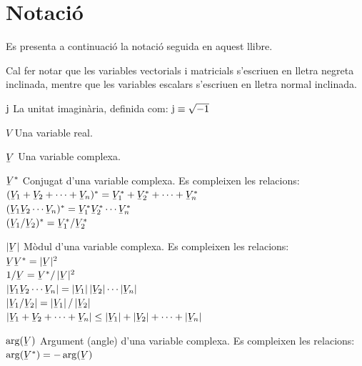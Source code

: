 \chapter*{Notaci\'{o}} 

Es presenta a continuaci\'{o} la notaci\'{o} seguida en aquest llibre.

Cal fer notar que les variables vectorials i matricials s'escriuen
en lletra negreta inclinada,  mentre que les variables escalars
s'escriuen en lletra normal inclinada.

\begin{list}{}
{\setlength{\labelwidth}{15mm} \setlength{\leftmargin}{20mm}
\setlength{\labelsep}{5mm}}
    \item[$\mathrm{j}$] La unitat imagin\`{a}ria, definida com:
    $\mathrm{j}\equiv\sqrt{-1}$
    \item[$V$] Una variable real.
    \item[$\cmplx{V}$] Una variable complexa.
    \item[$\cmplx{V}^*$] Conjugat d'una variable complexa.
    Es compleixen les relacions:\\[1ex]
     $(\cmplx{V}_1+\cmplx{V}_2+\cdots+\cmplx{V}_n)^* = \cmplx{V}_1^* +
    \cmplx{V}_2^*+\cdots+\cmplx{V}_n^*$\\[1ex]
    $(\cmplx{V}_1 \cmplx{V}_2 \cdots \cmplx{V}_n)^* = \cmplx{V}_1^*  \cmplx{V}_2^*
    \cdots \cmplx{V}_n^*$\\[1ex]
    $(\cmplx{V}_1 / \cmplx{V}_2)^* = \cmplx{V}_1^* / \cmplx{V}_2^*$
    \item[$|\cmplx{V}|$] M\`{o}dul d'una variable complexa.
    Es compleixen les relacions:\\[1ex]
      $\cmplx{V}\cmplx{V}^* = |\cmplx{V}|^2$\\[1ex]
      $1/ \cmplx{V} = \cmplx{V}^* / \,|\cmplx{V}|^2$\\[1ex]
      $|\cmplx{V}_1 \cmplx{V}_2 \cdots \cmplx{V}_n| =
       |\cmplx{V}_1| \,|\cmplx{V}_2| \cdots |\cmplx{V}_n|$\\[1ex]
       $|\cmplx{V}_1 / \cmplx{V}_2| = |\cmplx{V}_1| \,/ \,|\cmplx{V}_2|$\\[1ex]
      $|\cmplx{V}_1+\cmplx{V}_2+\cdots+\cmplx{V}_n| \leq
      |\cmplx{V}_1| + |\cmplx{V}_2| + \cdots  +|\cmplx{V}_n|$
    \item[$\arg(\cmplx{V})$] Argument (angle) d'una variable complexa.
     Es compleixen les relacions:\\[1ex]
      $\arg(\cmplx{V}^*) = - \arg(\cmplx{V})$\\[1ex]

\end{list}
